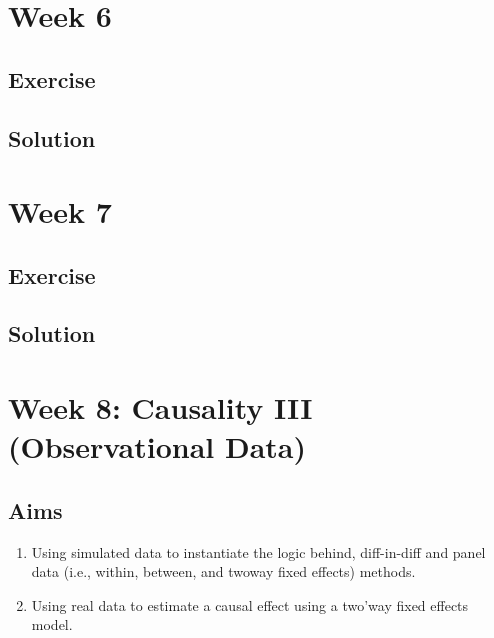 \documentclass[
]{book}
\providecommand{\tightlist}{%
  \setlength{\itemsep}{0pt}\setlength{\parskip}{0pt}}
\begin{document}
\hypertarget{week-6}{%
\chapter{Week 6}\label{week-6}}

\hypertarget{exercise-2}{%
\section{Exercise}\label{exercise-2}}

\hypertarget{solution-3}{%
\section{Solution}\label{solution-3}}

\hypertarget{week-7}{%
\chapter{Week 7}\label{week-7}}

\hypertarget{exercise-3}{%
\section{Exercise}\label{exercise-3}}

\hypertarget{solution-4}{%
\section{Solution}\label{solution-4}}

\hypertarget{week-8-causality-iii-observational-data}{%
\chapter{Week 8: Causality III (Observational Data)}\label{week-8-causality-iii-observational-data}}

\hypertarget{aims-3}{%
\section{Aims}\label{aims-3}}

\begin{enumerate}
\def\labelenumi{\arabic{enumi}.}
\tightlist
\item
  Using simulated data to instantiate the logic behind, diff-in-diff and panel data (i.e., within, between, and twoway fixed effects) methods.
\item
  Using real data to estimate a causal effect using a two'way fixed effects model.
\end{enumerate}
\end{document}
